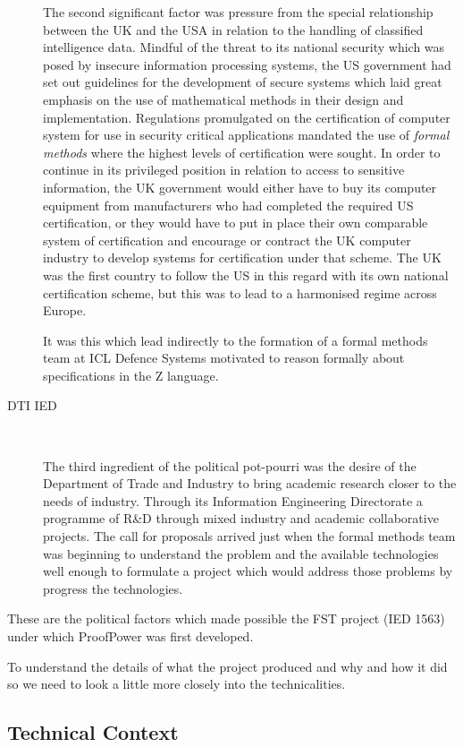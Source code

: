 \documentclass[10pt,titlepage]{book}
\def\Product{ProofPower}
\begin{document}
\begin{description}
The second significant factor was pressure from the special relationship between the UK and the USA in relation to the handling of classified intelligence data.
Mindful of the threat to its national security which was posed by insecure information processing systems, the US government had set out guidelines for the development of secure systems which laid great emphasis on the use of mathematical methods in their design and implementation.
Regulations promulgated on the certification of computer system for use in security critical applications mandated the use of {\it formal methods} where the highest levels of certification were sought.
In order to continue in its privileged position in relation to access to sensitive information, the UK government would either have to buy its computer equipment from manufacturers who had completed the required US certification, or they would have to put in place their own comparable system of certification and encourage or contract the UK computer industry to develop systems for certification under that scheme.
The UK was the first country to follow the US in this regard with its own national certification scheme, but this was to lead to a harmonised regime across Europe.

It was this which lead indirectly to the formation of a formal methods team at ICL Defence Systems motivated to reason formally about specifications in the Z language.

\item [DTI IED]
\ 

The third ingredient of the political pot-pourri was the desire of the Department of Trade and Industry to bring academic research closer to the needs of industry.
Through its Information Engineering Directorate a programme of R\&D through mixed industry and academic collaborative projects.
The call for proposals arrived just when the formal methods team was beginning to understand the problem and the available technologies well enough to formulate a project which would address those problems by progress the technologies.

\end{description}

These are the political factors which made possible the FST project (IED 1563) under which {\Product} was first developed.

To understand the details of what the project produced and why and how it did so we need to look a little more closely into the technicalities.

\subsection{Technical Context}
\end{document}
